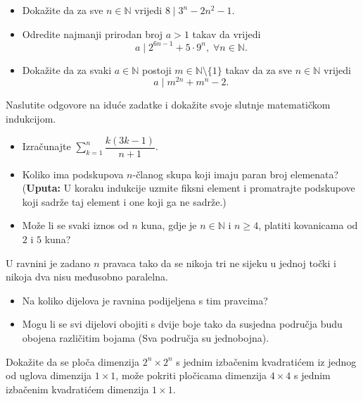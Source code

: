 \begin{exercise}{\unskip} \textbf{}
\begin{itemize}
\item[a)] Dokažite da za sve \(n\in \mathbb{N}\) vrijedi \(8 \mid 3^n-2n^2-1\).
\item[b)] Odredite najmanji prirodan broj \(a>1\) takav da vrijedi
\[a \mid 2^{6n-1}+5\cdot 9^n,\; \forall n\in \mathbb{N}.\]
\item[c)] Dokažite da za svaki $a\in \mathbb{N}$ postoji $m\in \mathbb{N}\setminus \{1\}$ takav da za sve $n\in \mathbb{N}$ vrijedi 
\[a \mid m^{2n}+m^n-2.\]
\end{itemize}
\end{exercise}
\begin{exercise}{\unskip} Naslutite odgovore na iduće zadatke i dokažite svoje slutnje matematičkom indukcijom.
\begin{itemize}
\item[a)] Izračunajte \(\sum\limits_{k=1}^n{\dfrac{k(3k-1)}{n+1}}.\)
\item[b)] Koliko ima podskupova $n$-članog skupa koji imaju paran broj elemenata? (\textbf{Uputa:} U koraku indukcije uzmite fiksni element i promatrajte podskupove koji sadrže taj element i one koji ga ne sadrže.)
\item[c)] Može li se svaki iznos od $n$ kuna, gdje je $n\in \mathbb{N}$ i $n\geq 4$, platiti kovanicama od $2$ i $5$ kuna?
\end{itemize}
\end{exercise}
\begin{exercise}{\unskip} U ravnini je zadano \(n\) pravaca tako da se nikoja tri ne sijeku u jednoj točki i nikoja dva nisu međusobno paralelna.
\begin{itemize}
\item[a)] Na koliko dijelova je ravnina podijeljena s tim pravcima?
\item[b)] Mogu li se svi dijelovi obojiti s dvije boje tako da susjedna područja budu obojena različitim bojama (Sva područja su jednobojna).
\end{itemize}
\end{exercise}
\begin{exercise}{\unskip}
Dokažite da se ploča dimenzija \(2^n\times 2^n\) s jednim izbačenim kvadratićem iz jednog od uglova dimenzija \(1\times 1\), može pokriti pločicama dimenzija \(4\times 4\) s jednim izbačenim kvadratićem dimenzija \(1\times 1\).
\end{exercise}
